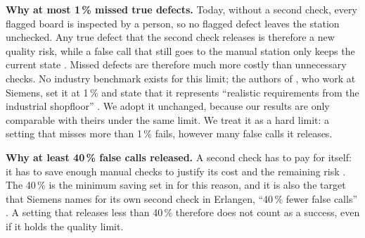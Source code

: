 \documentclass[11pt,a4paper]{article}
\begin{document}
\begin{center}
\end{center}

\textbf{Why at most 1\,\% missed true defects.} Today, without a second check, every flagged board is inspected by a person, so no flagged defect leaves the station unchecked. Any true defect that the second check releases is therefore a new quality risk, while a false call that still goes to the manual station only keeps the current state \cite[p.~4, Sec.~V]{pfab2025}. Missed defects are therefore much more costly than unnecessary checks. No industry benchmark exists for this limit; the authors of \cite{pfab2025}, who work at Siemens, set it at 1\,\% and state that it represents ``realistic requirements from the industrial shopfloor'' \cite[p.~4, Sec.~IV]{pfab2025}. We adopt it unchanged, because our results are only comparable with theirs under the same limit. We treat it as a hard limit: a setting that misses more than 1\,\% fails, however many false calls it releases.

\textbf{Why at least 40\,\% false calls released.} A second check has to pay for itself: it has to save enough manual checks to justify its cost and the remaining risk \cite[p.~4, Sec.~V]{pfab2025}. The 40\,\% is the minimum saving set in \cite{pfab2025} for this reason, and it is also the target that Siemens names for its own second check in Erlangen, ``40\,\% fewer false calls'' \cite{siemens2026}. A setting that releases less than 40\,\% therefore does not count as a success, even if it holds the quality limit.
\end{document}
